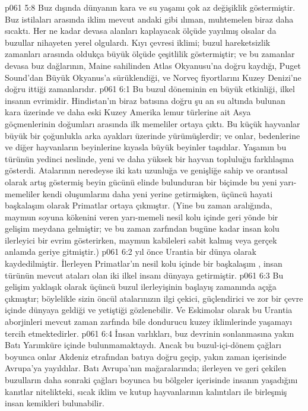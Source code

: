 \vs p061 5:8 Buz dışında dünyanın kara ve su yaşamı çok az değişiklik göstermiştir. Buz istilaları arasında iklim mevcut andaki gibi ılıman, muhtemelen biraz daha sıcaktı. Her ne kadar devasa alanları kaplayacak ölçüde yayılmış olsalar da buzullar nihayeten yerel olgulardı. Kıyı çevresi iklimi; buzul hareketsizlik zamanları arasında oldukça büyük ölçüde çeşitlilik göstermiştir; ve bu zamanlar devasa buz dağlarının, Maine sahilinden Atlas Okyanusu’na doğru kaydığı, Puget Sound’dan Büyük Okyanus’a sürüklendiği, ve Norveç fiyortlarını Kuzey Denizi’ne doğru ittiği zamanlarıdır.
\vs p061 6:1 Bu buzul döneminin en büyük etkinliği, ilkel insanın evrimidir. Hindistan’ın biraz batısına doğru şu an su altında bulunan kara üzerinde ve daha eski Kuzey Amerika lemur türlerine ait Asya göçmenlerinin doğumları arasında ilk memeliler  ortaya çıktı. Bu küçük hayvanlar büyük bir çoğunlukla arka ayakları üzerinde yürümüşlerdir; ve onlar, bedenlerine ve diğer hayvanların beyinlerine kıyasla büyük beyinler taşıdılar. Yaşamın bu türünün yedinci neslinde, yeni ve daha yüksek bir hayvan topluluğu  farklılaşma gösterdi. Atalarının neredeyse iki katı uzunluğa ve genişliğe sahip ve orantısal olarak artış göstermiş beyin gücünü elinde bulunduran bir biçimde bu yeni yarı\hyp{}memeliler kendi oluşumlarını daha yeni yerine getirmişken, üçüncü hayati başkalaşım olarak Primatlar  ortaya çıkmıştır. (Yine bu zaman aralığında, maymun soyuna kökenini veren yarı\hyp{}memeli nesil kolu içinde geri yönde bir gelişim meydana gelmiştir; ve bu zaman zarfından bugüne kadar insan kolu ilerleyici bir evrim gösterirken, maymun kabileleri sabit kalmış veya gerçek anlamda geriye gitmiştir.)
\vs p061 6:2  yıl önce Urantia  bir dünya olarak kaydedilmiştir. İlerleyen Primatlar’ın nesil kolu içinde bir başkalaşım , insan türünün mevcut ataları olan iki ilkel insanı dünyaya getirmiştir.
\vs p061 6:3 Bu gelişim yaklaşık olarak üçüncü buzul ilerleyişinin başlayış zamanında açığa çıkmıştır; böylelikle sizin öncül atalarınızın ilgi çekici, güçlendirici ve zor bir çevre içinde dünyaya geldiği ve yetiştiği gözlenebilir. Ve Eskimolar olarak bu Urantia aborjinleri mevcut zaman zarfında bile dondurucu kuzey iklimlerinde yaşamayı tercih etmektedirler.
\vs p061 6:4 İnsan varlıkları, buz devrinin sonlanmasına yakın Batı Yarımküre içinde bulunmamaktaydı. Ancak bu buzul\hyp{}içi\hyp{}dönem çağları boyunca onlar Akdeniz etrafından batıya doğru geçip, yakın zaman içerisinde Avrupa’ya yayıldılar. Batı Avrupa’nın mağaralarında; ilerleyen ve geri çekilen buzulların daha sonraki çağları boyunca bu bölgeler içerisinde insanın yaşadığını kanıtlar nitelikteki, sıcak iklim ve kutup hayvanlarının kalıntıları ile birleşmiş insan kemikleri bulunabilir.
